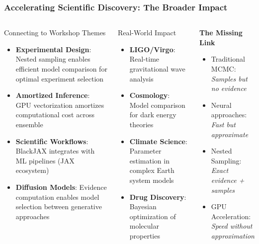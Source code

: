 \documentclass[aspectratio=169]{beamer}
\begin{document}
\begin{frame}
    \frametitle{Accelerating Scientific Discovery: The Broader Impact}
    \begin{columns}
        \begin{block}{Connecting to Workshop Themes}
            \begin{itemize}
                \item \textbf{Experimental Design}: Nested sampling enables efficient model comparison for optimal experiment selection
                \item \textbf{Amortized Inference}: GPU vectorization amortizes computational cost across ensemble
                \item \textbf{Scientific Workflows}: BlackJAX integrates with ML pipelines (JAX ecosystem)
                \item \textbf{Diffusion Models}: Evidence computation enables model selection between generative approaches
            \end{itemize}
        \end{block}
        \begin{block}{Real-World Impact}
            \begin{itemize}
                \item \textbf{LIGO/Virgo}: Real-time gravitational wave analysis
                \item \textbf{Cosmology}: Model comparison for dark energy theories
                \item \textbf{Climate Science}: Parameter estimation in complex Earth system models
                \item \textbf{Drug Discovery}: Bayesian optimization of molecular properties
            \end{itemize}
        \end{block}
        \vspace{20pt}
        \begin{center}
        \textbf{The Missing Link}\\[10pt]
        \begin{itemize}
            \item Traditional MCMC: \\ \emph{Samples but no evidence}
            \item Neural approaches: \\ \emph{Fast but approximate}
            \item Nested Sampling: \\ \emph{Exact evidence + samples}
            \item GPU Acceleration: \\ \emph{Speed without approximation}
        \end{itemize}
        \end{center}
    \end{columns}
\end{frame}
\end{document}
